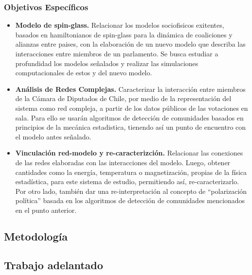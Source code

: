 \documentclass{proyectotesis}
\begin{document}
\subsubsection*{Objetivos Específicos}
\begin{itemize}
\item    {\bf Modelo de spin-glass.} Relacionar los modelos sociofisicos exitentes, basados en hamiltonianos de spin-glass para la dinámica de coaliciones y alianzas entre paises, con la elaboración de un nuevo modelo que describa las interacciones entre miembros de un parlamento. Se busca estudiar a profundidad los modelos señalados y realizar las simulaciones computacionales de estos y del nuevo modelo.
\item    {\bf Análisis de Redes Complejas.} Caracterizar la interacción entre miembros de la Cámara de Diputados de Chile, por medio de la representación del sistema como red compleja, a partir de los datos públicos de las votaciones en sala. Para ello se usarán algoritmos de detección de comunidades basados en principios de la mecánica estadistica, tienendo así un punto de encuentro con el modelo antes señalado.   

\item {\bf Vinculación red-modelo y re-caracterizción.} Relacionar las conexiones de las redes elaboradas con las interacciones del modelo. Luego, obtener cantidades como la energía, temperatura o magnetización, propias de la física estadística, para este sistema de estudio, permitiendo así, re-caracterizarlo. Por otro lado, también dar una re-interpretación al concepto de ``polarización política''  basada en los algoritmos de detección de comunidades mencionados en el punto anterior. 

\end{itemize}

\subsection{Metodología}

\subsection{Trabajo adelantado}
\end{document}
